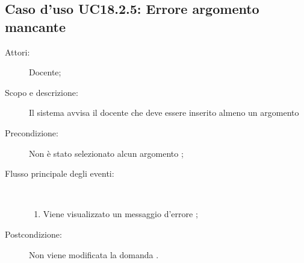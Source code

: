 \subsection{Caso d'uso UC18.2.5: Errore argomento mancante}\begin{description}
	\item[Attori:] Docente;
	\item[Scopo e descrizione:] Il sistema avvisa il docente che deve essere inserito almeno un argomento
	
	\item[Precondizione:] Non è stato selezionato alcun argomento
	;
	
	\item[Flusso principale degli eventi:] \ 
	\begin{enumerate}
		\item Viene visualizzato un messaggio d'errore	;
		
	\end{enumerate}
	\item[Postcondizione:] Non viene modificata la domanda
	.
\end{description}
\hypertarget{UC18.3}{}
